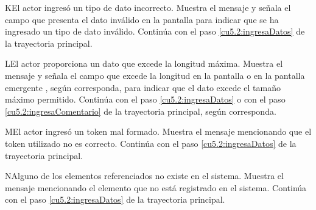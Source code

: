  \begin{UCtrayectoriaA}{K}{El actor ingresó un tipo de dato incorrecto.}
    \UCpaso[\UCsist] Muestra el mensaje  y señala el campo que presenta el dato inválido en la 
    pantalla  para indicar que se ha ingresado un tipo de dato inválido.
    \UCpaso[] Continúa con el paso \ref{cu5.2:ingresaDatos} de la trayectoria principal.
 \end{UCtrayectoriaA}
 \begin{UCtrayectoriaA}{L}{El actor proporciona un dato que excede la longitud máxima.}
    \UCpaso[\UCsist] Muestra el mensaje  y señala el campo que excede la 
    longitud en la pantalla  o en la pantalla emergente , según corresponda, para indicar que el dato excede el tamaño máximo permitido.
    \UCpaso[] Continúa con el paso \ref{cu5.2:ingresaDatos} o con el paso \ref{cu5.2:ingresaComentario} de la trayectoria principal, según corresponda.
 \end{UCtrayectoriaA}
 \begin{UCtrayectoriaA}{M}{El actor ingresó un token mal formado.}
    \UCpaso[\UCsist] Muestra el mensaje  mencionando que el token utilizado no es correcto.
    \UCpaso[] Continúa con el paso \ref{cu5.2:ingresaDatos} de la trayectoria principal.
 \end{UCtrayectoriaA}
 \begin{UCtrayectoriaA}{N}{Alguno de los elementos referenciados no existe en el sistema.}
    \UCpaso[\UCsist] Muestra el mensaje  mencionando el elemento que no está registrado en el sistema.
    \UCpaso[] Continúa con el paso \ref{cu5.2:ingresaDatos} de la trayectoria principal.
 \end{UCtrayectoriaA}
